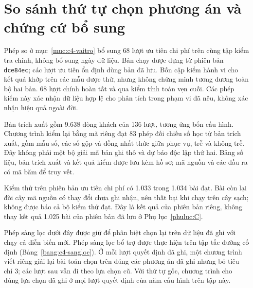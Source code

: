 \section{So sánh thứ tự chọn phương án và chứng cứ bổ sung}
\label{phuluc:D}
\setcounter{table}{0}

Phép so ở mục~\ref{muc:c4-vaitro} bổ sung 68 lượt ưu tiên chi phí trên cùng tập kiểm tra chính, không bổ sung
ngày dữ liệu. Bản chạy được dựng từ phiên bản \texttt{dce84ec}; các lượt ưu tiên ổn định dùng bản đã lưu.
Bốn cặp kiểm hành vi cho kết quả khớp trên các mẫu được thử, nhưng không chứng minh tương đương toàn bộ hai
bản. 68 lượt chính hoàn tất và qua kiểm tính toàn vẹn cuối. Các phép kiểm này xác nhận dữ liệu hợp lệ cho
phân tích trong phạm vi đã nêu, không xác nhận hiệu quả ngoài đời.

Bản trích xuất gồm 9.638 dòng khách của 136 lượt, tương ứng bốn cấu hình. Chương trình kiểm lại bằng mã riêng
đạt 83 phép đối chiếu số học từ bản trích xuất, gồm mẫu số, các số gộp và đồng nhất thức giữa phục vụ, trễ và
không trễ. Đây không phải một bộ giải mã bản ghi thô và dự báo độc lập thứ hai. Bảng số liệu, bản trích xuất
và kết quả kiểm được lưu kèm hồ sơ; mã nguồn và các đầu ra có mã băm để truy vết.

Kiểm thử trên phiên bản ưu tiên chi phí có 1.033 trong 1.034 bài đạt. Bài còn lại đòi cây mã nguồn có thay
đổi chưa ghi nhận, nên thất bại khi chạy trên cây sạch; không được báo cả bộ kiểm thử đạt. Đây là kết quả
của phiên bản riêng, không thay kết quả 1.025 bài của phiên bản đã lưu ở Phụ lục~\ref{phuluc:C}.

Phép sàng lọc dưới đây được giữ để phân biệt chọn lại trên dữ liệu đã ghi với chạy cả diễn biến mới.
Phép sàng lọc bổ trợ được thực hiện trên tập tắc đường cố định (Bảng~\ref{bang:c4-sangloc}). Ở mỗi lượt quyết định
đã ghi, một chương trình viết riêng giải lại bài toán chọn trên đúng các phương án đã ghi nhưng bỏ tiêu chí 3; các lượt
sau vẫn đi theo lựa chọn cũ. Với thứ tự gốc, chương trình cho đúng lựa chọn đã ghi ở mọi lượt quyết định của năm cấu
hình trên tập này.

